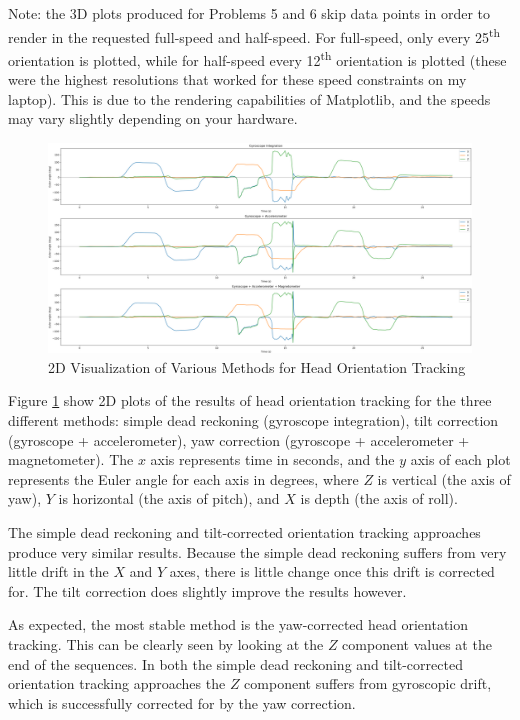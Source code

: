 \documentclass[11pt,a4paper]{article}
\begin{document}
	Note: the 3D plots produced for Problems 5 and 6 skip data points in order to render in the requested full-speed and half-speed. For full-speed, only every 25\textsuperscript{th} orientation is plotted, while for half-speed every 12\textsuperscript{th} orientation is plotted (these were the highest resolutions that worked for these speed constraints on my laptop). This is due to the rendering capabilities of Matplotlib, and the speeds may vary slightly depending on your hardware.
	
	\begin{figure}[h!]
		\centering
		\includegraphics[width=1.0\linewidth]{figures/Orientation_Tracking_2D}
		\caption{2D Visualization of Various Methods for Head Orientation Tracking}
		\label{2D_Orientation}
	\end{figure}
	
	Figure \ref{2D_Orientation} show 2D plots of the results of head orientation tracking for the three different methods: simple dead reckoning (gyroscope integration), tilt correction (gyroscope + accelerometer), yaw correction (gyroscope + accelerometer + magnetometer). The $x$ axis represents time in seconds, and the $y$ axis of each plot represents the Euler angle for each axis in degrees, where $Z$ is vertical (the axis of yaw), $Y$ is horizontal (the axis of pitch), and $X$ is depth (the axis of roll).
	
	The simple dead reckoning and tilt-corrected orientation tracking approaches produce very similar results. Because the simple dead reckoning suffers from very little drift in the $X$ and $Y$ axes, there is little change once this drift is corrected for. The tilt correction does slightly improve the results however.
	
	As expected, the most stable method is the yaw-corrected head orientation tracking. This can be clearly seen by looking at the $Z$ component values at the end of the sequences. In both the simple dead reckoning and tilt-corrected orientation tracking approaches the $Z$ component suffers from gyroscopic drift, which is successfully corrected for by the yaw correction.
	
\end{document}
